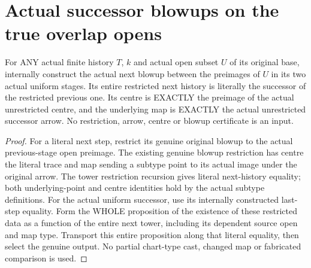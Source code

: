 \section{Actual successor blowups on the true overlap opens}

\begin{theorem}
\label{hir:sharp-actual-curve-uniform-successor-open-restriction}
\leanok
For ANY actual finite history $T$, $k$ and actual open subset $U$ of its
original base, internally construct the actual next blowup between the
preimages of $U$ in its two actual uniform stages. Its entire restricted
next history is literally the successor of the restricted previous one.
Its centre is EXACTLY the preimage of the actual unrestricted centre,
and the underlying map is EXACTLY the actual unrestricted successor arrow.
No restriction, arrow, centre or blowup certificate is an input.
\end{theorem}
\begin{proof}
For a literal next step, restrict its genuine original blowup to the
actual previous-stage open preimage. The existing genuine blowup restriction
has centre the literal trace and map sending a subtype point to its actual
image under the original arrow. The tower restriction recursion gives
literal next-history equality; both underlying-point and centre identities
hold by the actual subtype definitions.
For the actual uniform successor, use its internally constructed last-step
equality. Form the WHOLE proposition of the existence of these restricted
data as a function of the entire next tower, including its dependent
source open and map type. Transport this entire proposition along that
literal equality, then select the genuine output. No partial chart-type
cast, changed map or fabricated comparison is used.
\end{proof}

